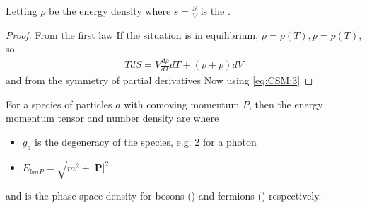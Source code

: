 \documentclass{article}
\begin{document}
\begin{prop}
Letting $\rho$ be the energy density
where $s=\frac{S}{V}$ is the .
\end{prop}
\begin{proof}
From the first law
If the situation is in equilibrium, $\rho=\rho(T), p=p(T)$, so 
\begin{align} \label{eq:CSM:3}
TdS = V \frac{d\rho}{dT} dT + (\rho + p) dV
\end{align}
and from the symmetry of partial derivatives 
Now using \ref{eq:CSM:3} 
\end{proof}

\begin{definition}
For a species of particles $a$ with comoving momentum $P$, then the energy momentum tensor and number density are 
where 
\begin{itemize}
    \item $g_a$ is the degeneracy of the species, e.g. 2 for a photon
    \item $E_{bm{P}} = \sqrt{m^2 + |\bm{P}|^2}$
\end{itemize}
and 
is the phase space density for bosons () and fermions () respectively. 
\end{definition}
\end{document}
